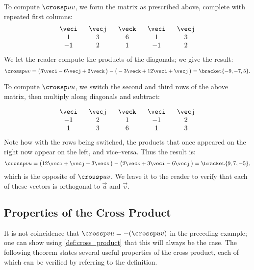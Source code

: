 {To compute $\crossp uv$, we form the matrix as prescribed above, complete with repeated first columns:
\[\begin{array}{ccccc} \ \veci\ &\ \vecj\ &\ \veck\ &\ \veci\ &\ \vecj\ \\  1&3&6&1&3\\-1&2&1&-1&2\end{array}\]
We let the reader compute the products of the diagonals; we give the result:
\[\crossp uv = \big(3\veci-6\vecj+2\veck\,\big) - \big(-3\veck + 12\veci+\vecj\,\big) = \bracket{-9,-7,5}.\]

To compute $\crossp vu$, we switch the second and third rows of the above matrix, then multiply along diagonals and subtract:

\[\begin{array}{ccccc} \ \veci\ &\ \vecj\ &\ \veck\ &\ \veci\ &\ \vecj\ \\-1&2&1&-1&2\\  1&3&6&1&3\end{array}\]
Note how with the rows being switched, the products that once appeared on the right now appear on the left, and vice--versa. Thus the result is:
\[\crossp vu = \big(12\veci+\vecj-3\veck\,\big) - \big(2\veck + 3\veci-6\vecj\,\big) = \bracket{9,7,-5},\]
which is the opposite of $\crossp uv$. We leave it to the reader to verify that each of these vectors is orthogonal to $\vec u$ and $\vec v$.}

\subsection*{Properties of the Cross Product}

It is not coincidence that $\crossp vu = -(\crossp uv)$ in the preceding example; one can show using \autoref{def:cross_product} that this will always be the case. The following theorem states several useful properties of the cross product, each of which can be verified by referring to the definition.

